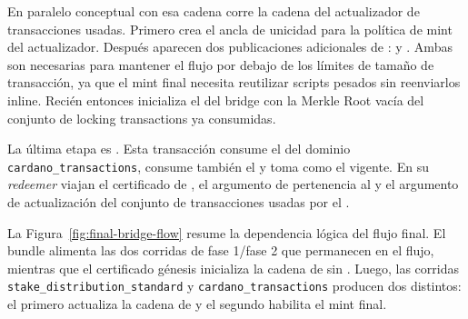 En paralelo conceptual con esa cadena corre la cadena del actualizador de transacciones usadas. Primero \LockingTxsUpdaterSeedTxTemplate crea el ancla de unicidad para la política de mint del actualizador. Después aparecen dos publicaciones adicionales de \ReferenceScripts: \PublishMintingTxsUpdaterSpendReferenceScriptTx y \PublishBridgeMintingReferenceScriptTx. Ambas son necesarias para mantener el flujo por debajo de los límites de tamaño de transacción, ya que el mint final necesita reutilizar scripts pesados sin reenviarlos inline. Recién entonces \MintingTxsUpdaterSeedTxTemplate inicializa el \TxsUpdaterUTxO del bridge con la Merkle Root vacía del conjunto de locking transactions ya consumidas.

La última etapa es \BridgeMintTxTemplate. Esta transacción consume el \ProofReceipt del dominio \texttt{cardano\_transactions}, consume también el \TxsUpdaterUTxO y toma como \ReferenceInput el \StakeDistributionUTxO vigente. En su \textit{redeemer} viajan el certificado de \TransactionSnapshot, el argumento \Groth de pertenencia al \Snapshot y el argumento \Groth de actualización del conjunto de transacciones usadas por el \zkBridge.

La Figura~\ref{fig:final-bridge-flow} resume la dependencia lógica del flujo final. El bundle \STM alimenta las dos corridas de fase 1/fase 2 que permanecen en el flujo, mientras que el certificado génesis inicializa la cadena de \StakeDistribution sin \ProofReceipt. Luego, las corridas \texttt{stake\_distribution\_standard} y \texttt{cardano\_transactions} producen dos \ProofReceipt distintos: el primero actualiza la cadena de \StakeDistribution y el segundo habilita el mint final.

